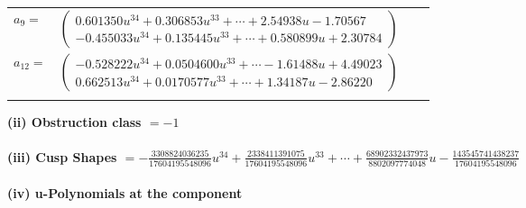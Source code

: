 \documentclass[1p]{elsarticle_modified}
\theoremstyle{definition}
\begin{document}
\begin{tabular}{m{7pt} m{180pt} m{7pt} m{180pt} }
\flushright $a_{9}=$&$\begin{pmatrix}0.601350 u^{34}+0.306853 u^{33}+\cdots+2.54938 u-1.70567\\-0.455033 u^{34}+0.135445 u^{33}+\cdots+0.580899 u+2.30784\end{pmatrix}$ \\
\flushright $a_{12}=$&$\begin{pmatrix}-0.528222 u^{34}+0.0504600 u^{33}+\cdots-1.61488 u+4.49023\\0.662513 u^{34}+0.0170577 u^{33}+\cdots+1.34187 u-2.86220\end{pmatrix}$\\&\end{tabular}
\flushleft \textbf{(ii) Obstruction class $= -1$}\\~\\
\flushleft \textbf{(iii) Cusp Shapes $= -\frac{3308824036235}{17604195548096} u^{34}+\frac{2338411391075}{17604195548096} u^{33}+\cdots+\frac{68902332437973}{8802097774048} u-\frac{143545741438237}{17604195548096}$}\\~\\
\newpage\renewcommand{\arraystretch}{1}
\flushleft \textbf{(iv) u-Polynomials at the component}\newline \\
\end{document}
